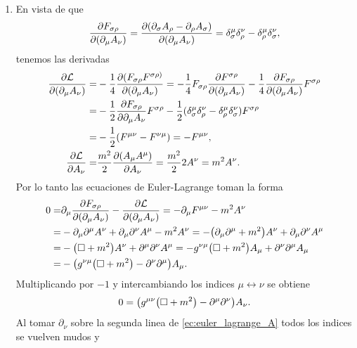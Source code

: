 \documentclass{article}
\begin{document}
\begin{enumerate}[1)]
\item En vista de que
\begin{equation}
\pdv{F_{\sigma\rho}}{(\partial_\mu A_\nu)}=\pdv{(\partial_\sigma A_\rho-\partial_\rho A_\sigma)}{(\partial_\mu A_\nu)}=\delta_\sigma^\mu\delta_\rho^\nu-\delta_\rho^\mu\delta_\sigma^\nu,
\end{equation}
tenemos las derivadas
\begin{align}
\begin{split}
\pdv{\mathcal{L}}{(\partial_\mu A_\nu)}=&-\frac{1}{4}\pdv{(F_{\sigma\rho}F^{\sigma\rho)}}{(\partial_\mu A_\nu)}=-\frac{1}{4}F_{\sigma\rho}\pdv{F^{\sigma\rho}}{(\partial_\mu A_\nu)}-\frac{1}{4}\pdv{F_{\sigma\rho}}{(\partial_\mu A_\nu)}F^{\sigma\rho}\\
=&-\frac{1}{2}\pdv{F_{\sigma\rho}}{\partial_\mu A_\nu}F^{\sigma\rho}-\frac{1}{2}(\delta_\sigma^\mu\delta_\rho^\nu-\delta_\rho^\mu\delta_\sigma^\nu)F^{\sigma\rho}\\
=&-\frac{1}{2}(F^{\mu\nu}-F^{\nu\mu})=-F^{\mu\nu},\\
\pdv{\mathcal{L}}{A_\nu}=&\frac{m^2}{2}\pdv{(A_\mu A^\mu)}{A_\nu}=\frac{m^2}{2}2A^\nu=m^2 A^\nu.
\end{split}
\end{align}
Por lo tanto las ecuaciones de Euler-Lagrange toman la forma
\begin{align}\label{ec:euler_lagrange_A}
\begin{split}
0=&\partial_\mu\pdv{F_{\sigma\rho}}{(\partial_\mu A_\nu)}-\pdv{\mathcal{L}}{(\partial_\mu A_\nu)}=-\partial_\mu F^{\mu\nu}-m^2 A^\nu\\
=&-\partial_\mu\partial^\mu A^\nu+\partial_\mu\partial^\nu A^\mu-m^2 A^\nu=-\qty(\partial_\mu\partial^\mu+m^2)A^\nu+\partial_\mu\partial^\nu A^\mu\\
=&-\qty(\Box+m^2)A^\nu+\partial^\mu\partial^\nu A^\mu=-g^{\nu\mu}\qty(\Box+m^2)A_\mu+\partial^\nu\partial^\mu A_\mu\\
=&-\qty(g^{\nu\mu}\qty(\Box+m^2)-\partial^\nu\partial^\mu)A_\mu.
\end{split}
\end{align}
Multiplicando por $-1$ y intercambiando los indices $\mu\leftrightarrow\nu$ se obtiene
\begin{equation}\label{ec:solucion_5}
0=\qty(g^{\mu\nu}\qty(\Box+m^2)-\partial^\mu\partial^\nu)A_\nu.
\end{equation}
Al tomar $\partial_\nu$ sobre la segunda linea de \eqref{ec:euler_lagrange_A} todos los indices se vuelven mudos y 
\begin{align}

\end{align}
\end{enumerate}
\end{document}
